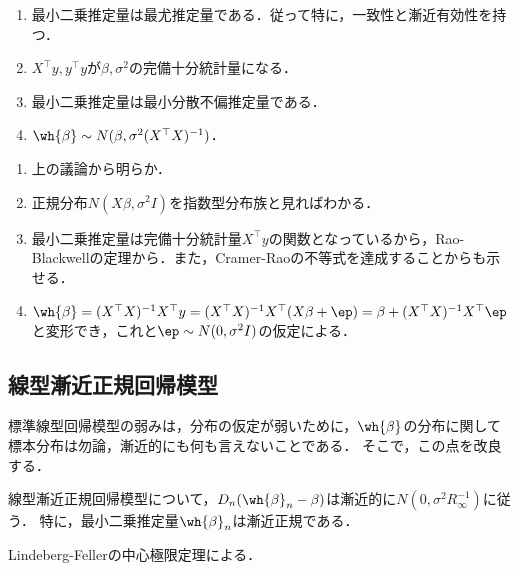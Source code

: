 \documentclass[uplatex,dvipdfmx]{jsreport}
\begin{document}
\begin{theorem}\mbox{}
    \begin{enumerate}
        \item 最小二乗推定量は最尤推定量である．従って特に，一致性と漸近有効性を持つ．
        \item $X^\top y,y^\top y$が$\beta,\sigma^2$の完備十分統計量になる．
        \item 最小二乗推定量は最小分散不偏推定量である．
        \item $\wh{\beta}\sim N(\beta,\sigma^2(X^\top X)^{-1})$．
    \end{enumerate}
\end{theorem}
\begin{Proof}\mbox{}
    \begin{enumerate}
        \item 上の議論から明らか．
        \item 正規分布$N(X\beta,\sigma^2I)$を指数型分布族と見ればわかる．
        \item 最小二乗推定量は完備十分統計量$X^\top y$の関数となっているから，Rao-Blackwellの定理から．また，Cramer-Raoの不等式を達成することからも示せる．
        \item $\wh{\beta}=(X^\top X)^{-1}X^\top y=(X^\top X)^{-1}X^\top(X\beta+\ep)=\beta+(X^\top X)^{-1}X^\top\ep$と変形でき，これと$\ep\sim N(0,\sigma^2I)$の仮定による．
    \end{enumerate}
\end{Proof}

\subsection{線型漸近正規回帰模型}

\begin{tcolorbox}[colframe=ForestGreen, colback=ForestGreen!10!white,breakable,colbacktitle=ForestGreen!40!white,coltitle=black,fonttitle=\bfseries\sffamily,
title=]
    標準線型回帰模型の弱みは，分布の仮定が弱いために，$\wh{\beta}$の分布に関して標本分布は勿論，漸近的にも何も言えないことである．
    そこで，この点を改良する．
\end{tcolorbox}

\begin{theorem}
    線型漸近正規回帰模型について，$D_n(\wh{\beta}_n-\beta)$は漸近的に$N(0,\sigma^2R_\infty^{-1})$に従う．
    特に，最小二乗推定量$\wh{\beta}_n$は漸近正規である．
\end{theorem}
\begin{Proof}
    Lindeberg-Fellerの中心極限定理による．
\end{Proof}
\end{document}
